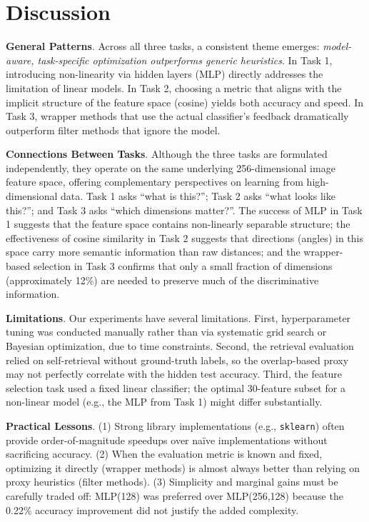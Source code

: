 \documentclass[onecolumn,a4paper,12pt]{IEEEtran}
\begin{document}
\section{Discussion}
\label{sec:discussion}

\textbf{General Patterns}. Across all three tasks, a consistent theme emerges: \emph{model-aware, task-specific optimization outperforms generic heuristics}. In Task 1, introducing non-linearity via hidden layers (MLP) directly addresses the limitation of linear models. In Task 2, choosing a metric that aligns with the implicit structure of the feature space (cosine) yields both accuracy and speed. In Task 3, wrapper methods that use the actual classifier's feedback dramatically outperform filter methods that ignore the model.

\textbf{Connections Between Tasks}. Although the three tasks are formulated independently, they operate on the same underlying 256-dimensional image feature space, offering complementary perspectives on learning from high-dimensional data. Task 1 asks ``what is this?''; Task 2 asks ``what looks like this?''; and Task 3 asks ``which dimensions matter?''. The success of MLP in Task 1 suggests that the feature space contains non-linearly separable structure; the effectiveness of cosine similarity in Task 2 suggests that directions (angles) in this space carry more semantic information than raw distances; and the wrapper-based selection in Task 3 confirms that only a small fraction of dimensions (approximately 12\%) are needed to preserve much of the discriminative information.

\textbf{Limitations}. Our experiments have several limitations. First, hyperparameter tuning was conducted manually rather than via systematic grid search or Bayesian optimization, due to time constraints. Second, the retrieval evaluation relied on self-retrieval without ground-truth labels, so the overlap-based proxy may not perfectly correlate with the hidden test accuracy. Third, the feature selection task used a fixed linear classifier; the optimal 30-feature subset for a non-linear model (e.g., the MLP from Task 1) might differ substantially.

\textbf{Practical Lessons}. (1) Strong library implementations (e.g., \texttt{sklearn}) often provide order-of-magnitude speedups over na\"ive implementations without sacrificing accuracy. (2) When the evaluation metric is known and fixed, optimizing it directly (wrapper methods) is almost always better than relying on proxy heuristics (filter methods). (3) Simplicity and marginal gains must be carefully traded off: MLP(128) was preferred over MLP(256,128) because the 0.22\% accuracy improvement did not justify the added complexity.
\end{document}
